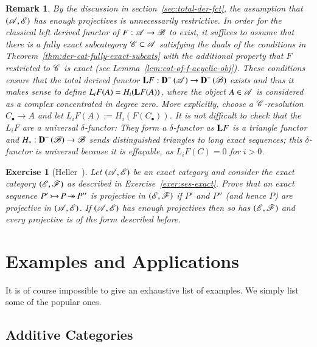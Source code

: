 \documentclass[1p]{elsarticle}
\theoremstyle{mythm}
\theoremstyle{mydef}
\newtheorem{Exer}[Thm]{Exercise}
\newtheorem{Rem}[Thm]{Remark}
\begin{document}
\begin{Rem}
  By the discussion in section~\ref{sec:total-der-fct}, the assumption
  that $(\operatorname{\mathscr{A}},\operatorname{\mathscr{E}})$ has enough projectives is unnecessarily
  restrictive. In order for the classical 
  left derived functor of $F:\operatorname{\mathscr{A}} \to
  \operatorname{\mathscr{B}}$ to exist, it suffices to assume that there is a fully exact
  subcategory $\operatorname{\mathscr{C}} \subset \operatorname{\mathscr{A}}$ satisfying the duals of the
  conditions in Theorem~\ref{thm:der-cat-fully-exact-subcats} with the
  additional property that $F$ restricted to $\operatorname{\mathscr{C}}$ is exact (see
  Lemma~\ref{lem:cat-of-f-acyclic-obj}). These conditions ensure that
  the total derived functor $\operatorname{\mathbf{L}}\!F: \operatorname{\mathbf{D}}^{-}{(\operatorname{\mathscr{A}})} \to
  \operatorname{\mathbf{D}}^{-}{(\operatorname{\mathscr{B}})}$ exists and thus it makes sense
  to define $L_{i}F(A) = H_{i}{(\operatorname{\mathbf{L}}\!F (A))}$, where the object $A
  \in \operatorname{\mathscr{A}}$ is considered as a complex concentrated in degree
  zero. More explicitly, choose a $\operatorname{\mathscr{C}}$-resolution
  $C_{\bullet} \to A$ and let $L_{i}F(A) := H_{i}{(F(C_{\bullet}))}$.
  It is not difficult to check that the $L_{i}F$ are a universal
  $\delta$-functor: They form a $\delta$-functor as $\operatorname{\mathbf{L}}\!F$ is a
  triangle functor and $H_{\ast}:\operatorname{\mathbf{D}}^{-}{(\operatorname{\mathscr{B}})} \to \operatorname{\mathscr{B}}$ 
  sends distinguished triangles to long exact sequences; this
  $\delta$-functor is universal because it is effa\c{c}able,
  as $L_{i}F(C) = 0$ for $i > 0$.
\end{Rem}


\begin{Exer}[{Heller~\cite[6.3, 6.5]{MR0100622}}]
  Let $(\operatorname{\mathscr{A}},\operatorname{\mathscr{E}})$ be an exact category and consider the exact
  category $(\operatorname{\mathscr{E}},\operatorname{\mathscr{F}})$ as described in
  Exercise~\ref{exer:ses-exact}.
  Prove that an exact sequence
  $P' \operatorname{\rightarrowtail} P \operatorname{\twoheadrightarrow} P''$ is projective in $(\operatorname{\mathscr{E}},\operatorname{\mathscr{F}})$ if $P'$ and
  $P''$ (and hence $P$) are projective in
  $(\operatorname{\mathscr{A}},\operatorname{\mathscr{E}})$. If $(\operatorname{\mathscr{A}},\operatorname{\mathscr{E}})$ has
  enough projectives then so has $(\operatorname{\mathscr{E}},\operatorname{\mathscr{F}})$ and every projective
  is of the form described before.
\end{Exer}


\section{Examples and Applications}
\label{sec:examples}

It is of course impossible to give an exhaustive list of examples. We
simply list some of the popular ones.

\subsection{Additive Categories}
\end{document}

